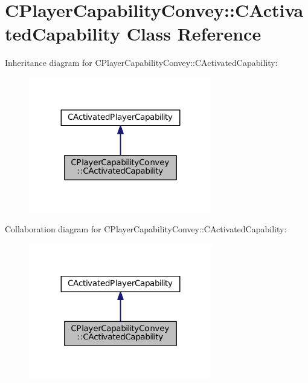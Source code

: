 \hypertarget{classCPlayerCapabilityConvey_1_1CActivatedCapability}{}\section{C\+Player\+Capability\+Convey\+:\+:C\+Activated\+Capability Class Reference}
\label{classCPlayerCapabilityConvey_1_1CActivatedCapability}


Inheritance diagram for C\+Player\+Capability\+Convey\+:\+:C\+Activated\+Capability\+:
\nopagebreak
\begin{figure}[H]
\begin{center}
\leavevmode
\includegraphics[width=227pt]{classCPlayerCapabilityConvey_1_1CActivatedCapability__inherit__graph}
\end{center}
\end{figure}


Collaboration diagram for C\+Player\+Capability\+Convey\+:\+:C\+Activated\+Capability\+:
\nopagebreak
\begin{figure}[H]
\begin{center}
\leavevmode
\includegraphics[width=227pt]{classCPlayerCapabilityConvey_1_1CActivatedCapability__coll__graph}
\end{center}
\end{figure}
